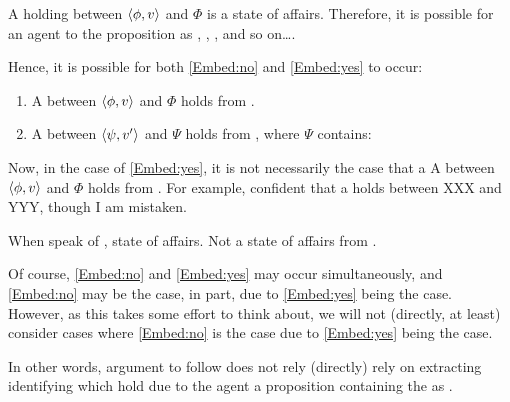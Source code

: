 \begin{note}
  A \ros{} holding between \(\langle \phi, v \rangle\) and \(\Phi\) is a state of affairs.
  Therefore, it is possible for an agent to \eval{} the proposition  as , , , and so on\dots.

  Hence, it is possible for both \ref{Embed:no} and \ref{Embed:yes} to occur:

  \begin{enumerate}[label=\arabic*., ref=(\arabic*)]
  \item
    \label{Embed:no}
    A  between \(\langle \phi, v \rangle\) and \(\Phi\) holds from .
  \item
    \label{Embed:yes}
    A  between \(\langle \psi, v' \rangle\) and \(\Psi\) holds from , where \(\Psi\) contains:

  \end{enumerate}

  Now, in the case of \ref{Embed:yes}, it is not necessarily the case that a A  between \(\langle \phi, v \rangle\) and \(\Phi\) holds from .
  For example, confident that a \ros{} holds between XXX and YYY, though I am mistaken.

  When speak of \ros{}, state of affairs.
  Not a state of affairs from .

  Of course, \ref{Embed:no} and \ref{Embed:yes} may occur simultaneously, and \ref{Embed:no} may be the case, in part, due to \ref{Embed:yes} being the case.
  However, as this takes some effort to think about, we will not (directly, at least) consider cases where \ref{Embed:no} is the case due to \ref{Embed:yes} being the case.

  In other words, argument to follow does not rely (directly) rely on extracting identifying \ros{} which hold due to the agent \evaling{} a proposition containing the \ros{} as .
\end{note}




